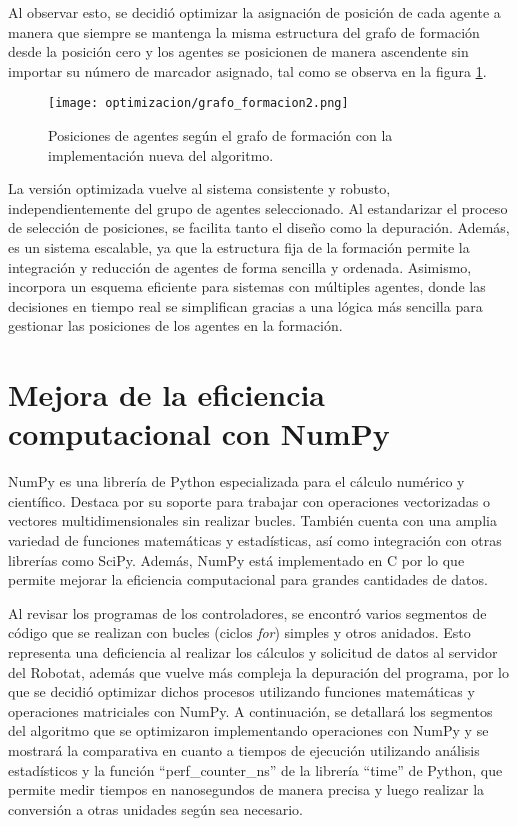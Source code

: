 Al observar esto, se decidió optimizar la asignación de posición de cada agente a manera que siempre se mantenga la misma estructura del grafo de formación desde la posición cero y los agentes se posicionen de manera ascendente sin importar su número de marcador asignado, tal como se observa en la figura \ref{fig:grafo_formacion2}.

\begin{figure}[H]
	\centering
	\texttt{[image: optimizacion/grafo\_formacion2.png]}
	\caption{Posiciones de agentes según el grafo de formación con la implementación nueva del algoritmo.}
	\label{fig:grafo_formacion2}
\end{figure}

La versión optimizada vuelve al sistema consistente y robusto, independientemente del grupo de agentes seleccionado. Al estandarizar el proceso de selección de posiciones, se facilita tanto el diseño como la depuración. Además, es un sistema escalable, ya que la estructura fija de la formación permite la integración y reducción de agentes de forma sencilla y ordenada. Asimismo, incorpora un esquema eficiente para sistemas con múltiples agentes, donde las decisiones en tiempo real se simplifican gracias a una lógica más sencilla para gestionar las posiciones de los agentes en la formación.

\section{Mejora de la eficiencia computacional con NumPy}
NumPy es una librería de Python especializada para el cálculo numérico y científico. Destaca por su soporte para trabajar con operaciones vectorizadas o vectores multidimensionales sin realizar bucles. También cuenta con una amplia variedad de funciones matemáticas y estadísticas, así como integración con otras librerías como SciPy. Además, NumPy está implementado en C por lo que permite mejorar la eficiencia computacional para grandes cantidades de datos.

Al revisar los programas de los controladores, se encontró varios segmentos de código que se realizan con bucles (ciclos \textit{for}) simples y otros anidados. Esto representa una deficiencia al realizar los cálculos y solicitud de datos al servidor del Robotat, además que vuelve más compleja la depuración del programa, por lo que se decidió optimizar dichos procesos utilizando funciones matemáticas y operaciones matriciales con NumPy. A continuación, se detallará los segmentos del algoritmo que se optimizaron implementando operaciones con NumPy y se mostrará la comparativa en cuanto a tiempos de ejecución utilizando análisis estadísticos y la función ``perf\_counter\_ns'' de la librería ``time'' de Python, que permite medir tiempos en nanosegundos de manera precisa y luego realizar la conversión a otras unidades según sea necesario.

